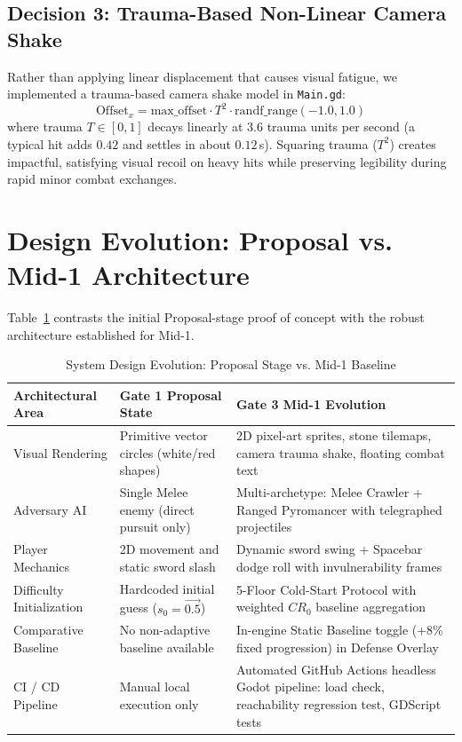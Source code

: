 \subsection{Decision 3: Trauma-Based Non-Linear Camera Shake}
Rather than applying linear displacement that causes visual fatigue, we implemented a trauma-based camera shake model in \texttt{Main.gd}:
\begin{equation}
\text{Offset}_x = \text{max\_offset} \cdot T^2 \cdot \text{randf\_range}(-1.0, 1.0)
\label{eq:trauma}
\end{equation}
where trauma $T \in [0, 1]$ decays linearly at $3.6$ trauma units per second (a typical hit adds $0.42$ and settles in about $0.12$\,s). Squaring trauma ($T^2$) creates impactful, satisfying visual recoil on heavy hits while preserving legibility during rapid minor combat exchanges.

\section{Design Evolution: Proposal vs. Mid-1 Architecture}
Table~\ref{tab:design_evolution} contrasts the initial Proposal-stage proof of concept with the robust architecture established for Mid-1.

\begin{table}[!htbp]
\centering
\caption{System Design Evolution: Proposal Stage vs. Mid-1 Baseline}
\label{tab:design_evolution}
\small
\begin{tabular}{p{}p{}p{}}
\toprule
\textbf{Architectural Area} & \textbf{Gate 1 Proposal State} & \textbf{Gate 3 Mid-1 Evolution} \\
\midrule
Visual Rendering & Primitive vector circles (white/red shapes) & 2D pixel-art sprites, stone tilemaps, camera trauma shake, floating combat text \\
Adversary AI & Single Melee enemy (direct pursuit only) & Multi-archetype: Melee Crawler + Ranged Pyromancer with telegraphed projectiles \\
Player Mechanics & 2D movement and static sword slash & Dynamic sword swing + Spacebar dodge roll with invulnerability frames \\
Difficulty Initialization & Hardcoded initial guess ($s_0 = \vec{0.5}$) & 5-Floor Cold-Start Protocol with weighted $CR_0$ baseline aggregation \\
Comparative Baseline & No non-adaptive baseline available & In-engine Static Baseline toggle (+8\% fixed progression) in Defense Overlay \\
CI / CD Pipeline & Manual local execution only & Automated GitHub Actions headless Godot pipeline: load check, reachability regression test, GDScript tests \\
\bottomrule
\end{tabular}
\end{table}

